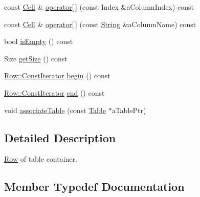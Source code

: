\begin{DoxyCompactItemize}
\item 
const \mbox{\hyperlink{namespacelibrary_1_1core_1_1ctnr_1_1table_aac6007d595b2967513e8e6b89f6092f5}{Cell}} \& \mbox{\hyperlink{classlibrary_1_1core_1_1ctnr_1_1table_1_1_row_a8fd76f9562104b7d92b91a8774609e6f}{operator\mbox{[}$\,$\mbox{]}}} (const Index \&a\+Column\+Index) const
\item 
const \mbox{\hyperlink{namespacelibrary_1_1core_1_1ctnr_1_1table_aac6007d595b2967513e8e6b89f6092f5}{Cell}} \& \mbox{\hyperlink{classlibrary_1_1core_1_1ctnr_1_1table_1_1_row_a6415c3a4cfde0e2c1e85fad3f972651a}{operator\mbox{[}$\,$\mbox{]}}} (const \mbox{\hyperlink{classlibrary_1_1core_1_1types_1_1_string}{String}} \&a\+Column\+Name) const
\item 
bool \mbox{\hyperlink{classlibrary_1_1core_1_1ctnr_1_1table_1_1_row_a3edb92bce425c8eca7b470ab8517df0a}{is\+Empty}} () const
\item 
Size \mbox{\hyperlink{classlibrary_1_1core_1_1ctnr_1_1table_1_1_row_a5e284f42caed1acf1df7c6655d0b93e0}{get\+Size}} () const
\item 
\mbox{\hyperlink{classlibrary_1_1core_1_1ctnr_1_1table_1_1_row_a293725deae1bf660d85c2d3ce905cb40}{Row\+::\+Const\+Iterator}} \mbox{\hyperlink{classlibrary_1_1core_1_1ctnr_1_1table_1_1_row_ac95a4df6fc29ca17d567e6a4560a2e9b}{begin}} () const
\item 
\mbox{\hyperlink{classlibrary_1_1core_1_1ctnr_1_1table_1_1_row_a293725deae1bf660d85c2d3ce905cb40}{Row\+::\+Const\+Iterator}} \mbox{\hyperlink{classlibrary_1_1core_1_1ctnr_1_1table_1_1_row_af7d6f076abf692bf84d412c42c840685}{end}} () const
\item 
void \mbox{\hyperlink{classlibrary_1_1core_1_1ctnr_1_1table_1_1_row_a1afbb0660b89062d230da20a46ee6335}{associate\+Table}} (const \mbox{\hyperlink{classlibrary_1_1core_1_1ctnr_1_1_table}{Table}} $\ast$a\+Table\+Ptr)
\end{DoxyCompactItemize}


\subsection{Detailed Description}
\mbox{\hyperlink{classlibrary_1_1core_1_1ctnr_1_1table_1_1_row}{Row}} of table container. 

\subsection{Member Typedef Documentation}
\mbox{\label{classlibrary_1_1core_1_1ctnr_1_1table_1_1_row_a293725deae1bf660d85c2d3ce905cb40}} 
